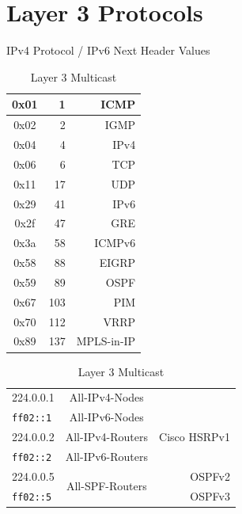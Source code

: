 \documentclass[12pt]{article}
\newcommand{\mr}[2]{\multirow{#1}{*}{#2}}
\begin{document}
\section{Layer 3 Protocols \label{sec:L3}}
	\begin{table}[H]
	\begin{minipage}{.35\linewidth}
	\centering
	\caption{IPv4 Protocol / IPv6 Next Header Values \label{tab:L3 PROTOCOL}}
	\begin{tabular}{| >{\ttfamily}c | r | r |}\hline
	0x01	& 1			& ICMP\\\hline
	0x02	& 2			& IGMP\\\hline
	0x04	& 4			& IPv4\\\hline
	0x06	& 6			& TCP\\\hline
	0x11	& 17			& UDP\\\hline
	0x29	& 41			& IPv6\\\hline
	0x2f	& 47			& GRE\\\hline
	0x3a 	& 58			& ICMPv6\\\hline
	0x58	& 88			& EIGRP\\\hline
	0x59	& 89			& OSPF\\\hline
	0x67	& 103			& PIM\\\hline
	0x70	& 112			& VRRP\\\hline
	0x89	& 137			& MPLS-in-IP\\\hline
	\end{tabular}\end{minipage}%
	\begin{minipage}{.6\linewidth}
	\centering
	\caption{Layer 3 Multicast \label{tab:MULTICAST L3}}
	\begin{tabular}{| l | c | r |}\hline
	224.0.0.1		& All-IPv4-Nodes			&\\
	\texttt{ff02::1}	& All-IPv6-Nodes			&\\\hline
	224.0.0.2		& All-IPv4-Routers		& Cisco HSRPv1\\
	\texttt{ff02::2}	& All-IPv6-Routers		&\\\hline
	224.0.0.5		& \mr{2}{All-SPF-Routers}	& OSPFv2\\
	\texttt{ff02::5}	&					& OSPFv3\\\hline

\end{tabular}
\end{minipage}
\end{table}
\end{document}
